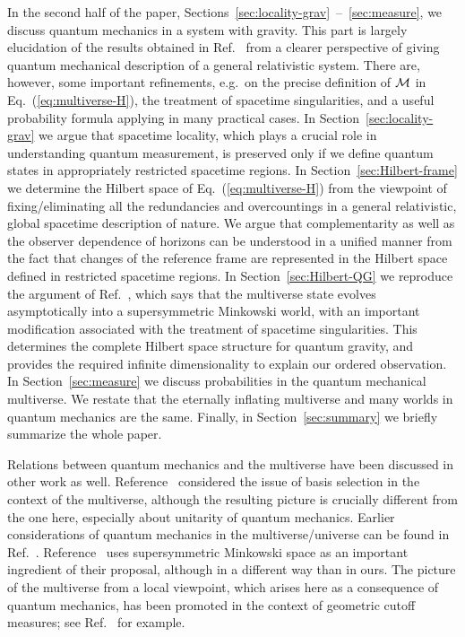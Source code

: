 \documentclass[12pt]{article}
\begin{document}
In the second half of the paper, 
Sections~\ref{sec:locality-grav}~--~\ref{sec:measure}, we 
discuss quantum mechanics in a system with gravity.  This part is 
largely elucidation of the results obtained in Ref.~\cite{Nomura:2011dt} 
from a clearer perspective of giving quantum mechanical description 
of a general relativistic system.  There are, however, some important 
refinements, e.g.\ on the precise definition of ${\cal M}$ in 
Eq.~(\ref{eq:multiverse-H}), the treatment of spacetime singularities, 
and a useful probability formula applying in many practical cases. 
In Section~\ref{sec:locality-grav} we argue that spacetime locality, 
which plays a crucial role in understanding quantum measurement, 
is preserved only if we define quantum states in appropriately 
restricted spacetime regions.  In Section~\ref{sec:Hilbert-frame} 
we determine the Hilbert space of Eq.~(\ref{eq:multiverse-H}) 
from the viewpoint of fixing/eliminating all the redundancies 
and overcountings in a general relativistic, global spacetime 
description of nature.  We argue that complementarity as well 
as the observer dependence of horizons can be understood in a 
unified manner from the fact that changes of the reference frame 
are represented in the Hilbert space defined in restricted spacetime 
regions.  In Section~\ref{sec:Hilbert-QG} we reproduce the argument 
of Ref.~\cite{Nomura:2011dt}, which says that the multiverse state evolves 
asymptotically into a supersymmetric Minkowski world, with an important 
modification associated with the treatment of spacetime singularities. 
This determines the complete Hilbert space structure for quantum 
gravity, and provides the required infinite dimensionality to explain 
our ordered observation.  In Section~\ref{sec:measure} we discuss 
probabilities in the quantum mechanical multiverse.  We restate that 
the eternally inflating multiverse and many worlds in quantum mechanics 
are the same.  Finally, in Section~\ref{sec:summary} we briefly 
summarize the whole paper.

Relations between quantum mechanics and the multiverse have been 
discussed in other work as well.  Reference~\cite{Bousso:2011up} 
considered the issue of basis selection in the context of the multiverse, 
although the resulting picture is crucially different from the one 
here, especially about unitarity of quantum mechanics.  Earlier 
considerations of quantum mechanics in the multiverse/universe can be 
found in Ref.~\cite{Aguirre:2010rw}.  Reference~\cite{Freivogel:2006xu} 
uses supersymmetric Minkowski space as an important ingredient of their 
proposal, although in a different way than in ours.  The picture of the 
multiverse from a local viewpoint, which arises here as a consequence 
of quantum mechanics, has been promoted in the context of geometric 
cutoff measures; see Ref.~\cite{Bousso:2006ev} for example.
\end{document}
